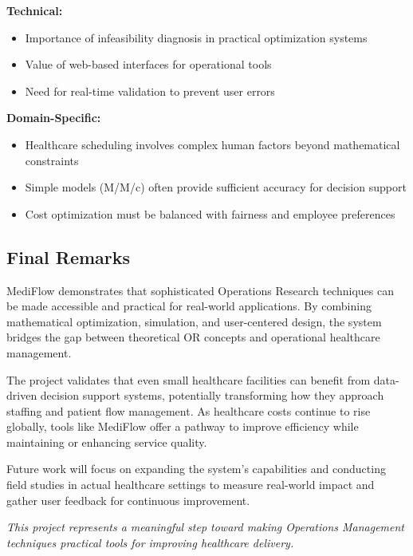 \documentclass[12pt,a4paper]{article}
\begin{document}
\textbf{Technical:}
\begin{itemize}
    \item Importance of infeasibility diagnosis in practical optimization systems
    \item Value of web-based interfaces for operational tools
    \item Need for real-time validation to prevent user errors
\end{itemize}

\textbf{Domain-Specific:}
\begin{itemize}
    \item Healthcare scheduling involves complex human factors beyond mathematical constraints
    \item Simple models (M/M/c) often provide sufficient accuracy for decision support
    \item Cost optimization must be balanced with fairness and employee preferences
\end{itemize}

\subsection{Final Remarks}

MediFlow demonstrates that sophisticated Operations Research techniques can be made accessible and practical for real-world applications. By combining mathematical optimization, simulation, and user-centered design, the system bridges the gap between theoretical OR concepts and operational healthcare management.

The project validates that even small healthcare facilities can benefit from data-driven decision support systems, potentially transforming how they approach staffing and patient flow management. As healthcare costs continue to rise globally, tools like MediFlow offer a pathway to improve efficiency while maintaining or enhancing service quality.

Future work will focus on expanding the system's capabilities and conducting field studies in actual healthcare settings to measure real-world impact and gather user feedback for continuous improvement.

\vspace{1em}

\textit{This project represents a meaningful step toward making Operations Management techniques practical tools for improving healthcare delivery.}

\newpage
\end{document}

